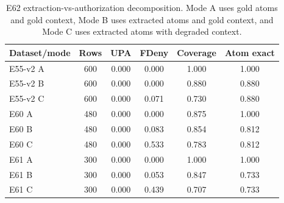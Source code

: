 \begin{table}[t]
\centering
\small
\caption{E62 extraction-vs-authorization decomposition. Mode A uses gold atoms and gold context, Mode B uses extracted atoms and gold context, and Mode C uses extracted atoms with degraded context.}
\label{tab:e62-decomposition}
\begin{tabular}{lccccc}
\toprule
Dataset/mode & Rows & UPA & FDeny & Coverage & Atom exact \\
\midrule
E55-v2 A & 600 & 0.000 & 0.000 & 1.000 & 1.000 \\
E55-v2 B & 600 & 0.000 & 0.000 & 0.880 & 0.880 \\
E55-v2 C & 600 & 0.000 & 0.071 & 0.730 & 0.880 \\
E60 A & 480 & 0.000 & 0.000 & 0.875 & 1.000 \\
E60 B & 480 & 0.000 & 0.083 & 0.854 & 0.812 \\
E60 C & 480 & 0.000 & 0.533 & 0.783 & 0.812 \\
E61 A & 300 & 0.000 & 0.000 & 1.000 & 1.000 \\
E61 B & 300 & 0.000 & 0.053 & 0.847 & 0.733 \\
E61 C & 300 & 0.000 & 0.439 & 0.707 & 0.733 \\
\bottomrule
\end{tabular}
\end{table}
